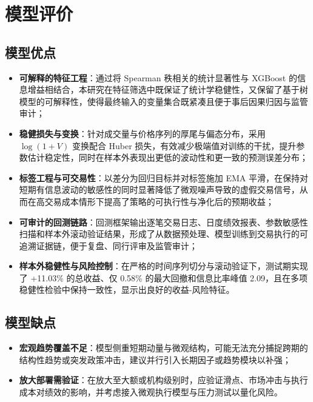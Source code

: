 \documentclass[withoutpreface,bwprint]{cumcmthesis}
\begin{document}
\newpage
\section{模型评价}

\subsection{模型优点}

\begin{itemize}
    \item \textbf{可解释的特征工程}：通过将 Spearman 秩相关的统计显著性与 XGBoost 的信息增益相结合，本研究在特征筛选中既保证了统计学稳健性，又保留了基于树模型的可解释性，使得最终输入的变量集合既紧凑且便于事后因果归因与监管审计；
    \item \textbf{稳健损失与变换}：针对成交量与价格序列的厚尾与偏态分布，采用 $\log(1+V)$ 变换配合 Huber 损失，有效减少极端值对训练的干扰，提升参数估计稳定性，同时在样本外表现出更低的波动性和更一致的预测误差分布；
    \item \textbf{标签工程与可交易性}：以差分为回归目标并对标签施加 EMA 平滑，在保持对短期有信息波动的敏感性的同时显著降低了微观噪声导致的虚假交易信号，从而在高交易成本情形下提高了策略的可执行性与净化后的预期收益；
    \item \textbf{可审计的回测链路}：回测框架输出逐笔交易日志、日度绩效报表、参数敏感性扫描和样本外滚动验证结果，形成了从数据预处理、模型训练到交易执行的可追溯证据链，便于复盘、同行评审及监管审计；
    \item \textbf{样本外稳健性与风险控制}：在严格的时间序列切分与滚动验证下，测试期实现了 +11.03\% 的总收益、仅 0.58\% 的最大回撤和信息比率峰值 2.09，且在多项稳健性检验中保持一致性，显示出良好的收益-风险特征。
\end{itemize}

\subsection{模型缺点}

\begin{itemize}
    \item \textbf{宏观趋势覆盖不足}：模型侧重短期动量与微观结构，可能无法充分捕捉跨期的结构性趋势或突发政策冲击，建议并行引入长期因子或趋势模块以补强；
    \item \textbf{放大部署需验证}：在放大至大额或机构级别时，应验证滑点、市场冲击与执行成本对绩效的影响，并考虑接入微观执行模型与压力测试以量化风险。
\end{itemize}
\end{document}
